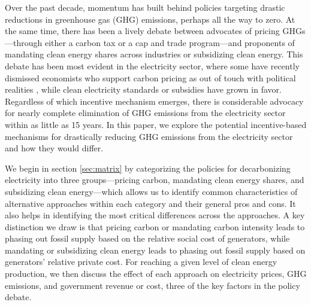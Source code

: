 \documentclass[12pt]{article}
\begin{document}
Over the past decade, momentum has built behind policies targeting drastic reductions in greenhouse gas (GHG) emissions, perhaps all the way to zero. At the same time, there has been a lively debate between advocates of pricing GHGs---through either a carbon tax or a cap and trade program---and proponents of mandating clean energy shares across industries or subsidizing clean energy. This debate has been most evident in the electricity sector, where some have recently dismissed economists who support carbon pricing as out of touch with political realities \citep{stokesmildenberger2020}, while clean electricity standards or subsidies have grown in favor.  Regardless of which incentive mechanism emerges, there is considerable advocacy for nearly complete elimination of GHG emissions from the electricity sector within as little as 15 years. In this paper, we explore the potential incentive-based mechanisms for drastically reducing GHG emissions from the electricity sector and how they would differ.

We begin in section \ref{sec:matrix} by categorizing the policies for decarbonizing electricity into three groups---pricing carbon, mandating clean energy shares, and subsidizing clean energy---which allows us to identify common characteristics of alternative approaches within each category and their general pros and cons.  It also helps in identifying the most critical differences across the approaches. A key distinction we draw is that pricing carbon or mandating carbon intensity leads to phasing out fossil supply based on the relative social cost of generators, while mandating or subsidizing clean energy leads to phasing out fossil supply based on generators' relative private cost. For reaching a given level of clean energy production, we then discuss the effect of each approach on electricity prices, GHG emissions, and government revenue or cost, three of the key factors in the policy debate.  
\end{document}
